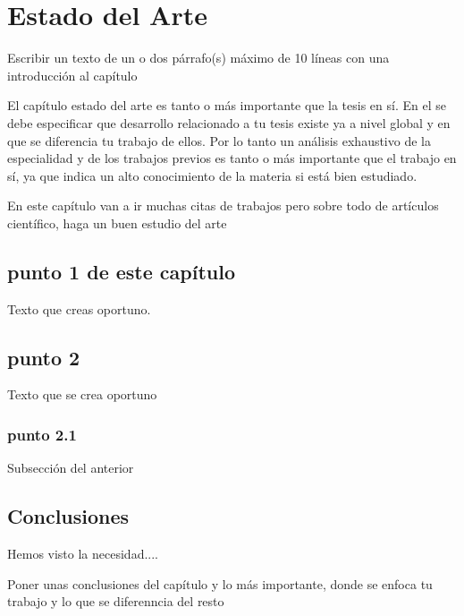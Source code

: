 \chapter{Estado del Arte}

Escribir un texto de un o dos párrafo(s) máximo de 10 líneas con una introducción al capítulo 

El capítulo estado del arte es tanto o más importante que la tesis en sí. En el se debe especificar que desarrollo relacionado a tu tesis existe ya a nivel global y en que se diferencia tu trabajo de ellos. Por lo tanto un análisis exhaustivo de la especialidad y de los trabajos previos es tanto o más importante que el trabajo en sí, ya que indica un alto conocimiento de la materia si está bien estudiado.

En este capítulo van a ir muchas citas \cite{Wan09} de trabajos pero sobre todo de artículos científico, haga un buen estudio del arte \cite{Shuo10,Feldmann03}


\section{punto 1 de este capítulo}
Texto que creas oportuno. 

\section{punto 2}
Texto que se crea oportuno

\subsection{punto 2.1}
Subsección del anterior

\section{Conclusiones}
Hemos visto la necesidad....

Poner unas conclusiones del capítulo y lo más importante, donde se enfoca tu trabajo y lo que se diferenncia del resto


